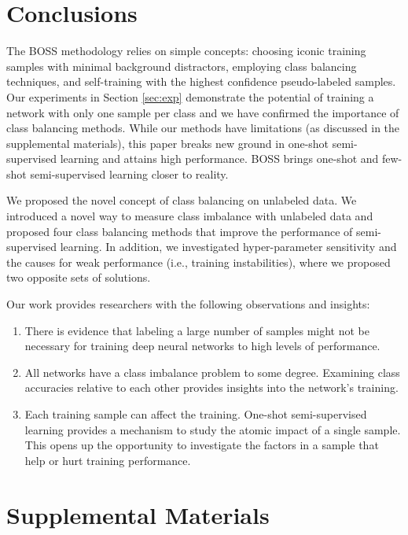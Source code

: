 \documentclass[final]{cvpr}
\newcommand{\SSL}{semi-supervised learning }
\newcommand{\SSLno}{semi-supervised learning}
\begin{document}
\section{Conclusions}
\label{sec:conclusions}

The BOSS methodology relies on simple concepts: choosing iconic training samples with minimal background distractors, employing class balancing techniques, and self-training with the highest confidence pseudo-labeled samples.
Our experiments in Section \ref{sec:exp} demonstrate the potential of training a network with only one sample per class and we have confirmed the importance of class balancing methods.
While our methods have limitations (as discussed in the supplemental materials), this paper breaks new ground in one-shot semi-supervised learning and attains high performance.
BOSS brings one-shot and few-shot \SSL closer to reality. 

We proposed the novel concept of class balancing on unlabeled data.  We introduced a novel way to measure  class imbalance with unlabeled data and proposed four class balancing methods that improve the performance of \SSLno.  In addition, we investigated hyper-parameter sensitivity and the causes for weak performance (i.e., training instabilities), where we proposed two opposite sets of solutions.

Our work provides researchers with the following observations and insights:
\begin{enumerate}
	\item There is evidence that labeling a large number of samples might not be necessary for training deep neural networks to high levels of performance.
	\item All networks have a class imbalance problem to some degree. Examining class accuracies relative to each other provides insights into the network's training.
	\item Each training sample can affect the training.  One-shot \SSL provides a mechanism to study the atomic impact of a single sample.  This opens up the opportunity to investigate the factors in a sample that help or hurt training performance.
\end{enumerate}





{\small


}


\appendix

\section{Supplemental Materials}
\label{sec:addRelated}
\end{document}
